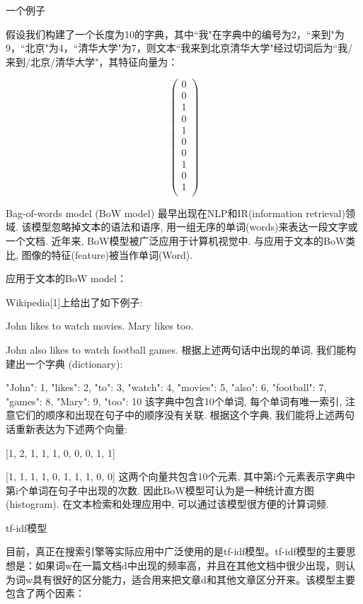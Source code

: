 \documentclass[10pt,a4paper]{ctexbook}
\begin{document}
一个例子

假设我们构建了一个长度为10的字典，其中``我"在字典中的编号为2，``来到"为9，``北京"为4，``清华大学"为7，则文本``我来到北京清华大学"经过切词后为``我/来到/北京/清华大学"，其特征向量为：

\begin{equation}
\left(
\begin{array}{c}
    0\\
    0\\
    1\\
    0\\
    1\\
    0\\
    0\\
    1\\
    0\\
    1\\
\end{array}
\right)
\end{equation}




Bag-of-words model (BoW model) 最早出现在NLP和IR(information retrieval)领域. 该模型忽略掉文本的语法和语序, 用一组无序的单词(words)来表达一段文字或一个文档. 近年来, BoW模型被广泛应用于计算机视觉中. 与应用于文本的BoW类比, 图像的特征(feature)被当作单词(Word).

应用于文本的BoW model：

Wikipedia[1]上给出了如下例子:

   John likes to watch movies. Mary likes too.

   John also likes to watch football games.
根据上述两句话中出现的单词, 我们能构建出一个字典 (dictionary):

{"John": 1, "likes": 2, "to": 3, "watch": 4, "movies": 5, "also": 6, "football": 7, "games": 8, "Mary": 9, "too": 10}
该字典中包含10个单词, 每个单词有唯一索引, 注意它们的顺序和出现在句子中的顺序没有关联. 根据这个字典, 我们能将上述两句话重新表达为下述两个向量:

  [1, 2, 1, 1, 1, 0, 0, 0, 1, 1]

  [1, 1, 1, 1, 0, 1, 1, 1, 0, 0]
这两个向量共包含10个元素, 其中第i个元素表示字典中第i个单词在句子中出现的次数. 因此BoW模型可认为是一种统计直方图 (histogram). 在文本检索和处理应用中, 可以通过该模型很方便的计算词频.

 
 
tf-idf模型

目前，真正在搜索引擎等实际应用中广泛使用的是tf-idf模型。tf-idf模型的主要思想是：如果词w在一篇文档d中出现的频率高，并且在其他文档中很少出现，则认为词w具有很好的区分能力，适合用来把文章d和其他文章区分开来。该模型主要包含了两个因素：
\end{document}

